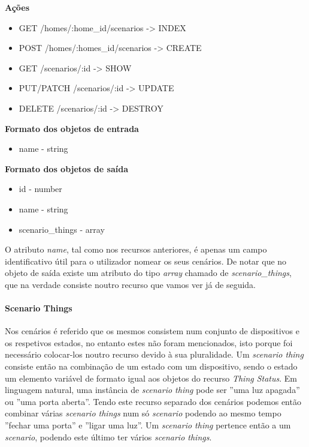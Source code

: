 \textbf{Ações}
\begin{itemize}
    \item GET /homes/:home{\_}id/scenarios -> INDEX
    \item POST /homes/:homes{\_}id/scenarios -> CREATE
    \item GET /scenarios/:id -> SHOW
    \item PUT/PATCH /scenarios/:id -> UPDATE
    \item DELETE /scenarios/:id -> DESTROY
\end{itemize}

\textbf{Formato dos objetos de entrada}
\begin{itemize}
    \item name - string
\end{itemize}

\textbf{Formato dos objetos de saída}
\begin{itemize}
    \item id - number
    \item name - string
    \item scenario{\_}things - array
\end{itemize}

O atributo \textit{name}, tal como nos recursos anteriores, é apenas um campo identificativo útil para o utilizador nomear os seus cenários. De notar que no objeto de saída existe um atributo do tipo \textit{array} chamado de \textit{scenario{\_}things}, que na verdade consiste noutro recurso que vamos ver já de seguida.

\paragraph*{Scenario Things}

Nos cenários é referido que os mesmos consistem num conjunto de dispositivos e os respetivos estados, no entanto estes não foram mencionados, isto porque foi necessário colocar-los noutro recurso devido à sua pluralidade. Um \textit{scenario thing} consiste então na combinação de um estado com um dispositivo, sendo o estado um elemento variável de formato igual aos objetos do recurso \textit{Thing Status}. Em linguagem natural, uma instância de \textit{scenario thing} pode ser ''uma luz apagada'' ou ''uma porta aberta''. Tendo este recurso separado dos cenários podemos então combinar várias \textit{scenario things} num só \textit{scenario} podendo ao mesmo tempo ''fechar uma porta'' e ''ligar uma luz''. Um \textit{scenario thing} pertence então a um \textit{scenario}, podendo este último ter vários \textit{scenario things}.

